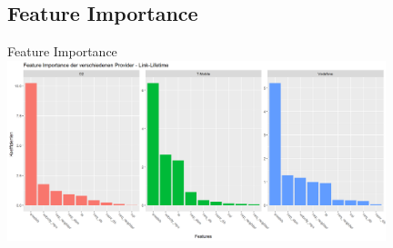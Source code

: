 \subsection{Feature Importance}


\begin{frame}{Feature Importance}
\includegraphics[width = 11cm]{plots/link_lifetime/feature_importance_enodeb}
\end{frame}